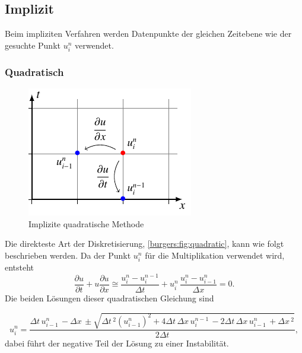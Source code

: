 \subsection{Implizit}
%
	Beim impliziten Verfahren werden Datenpunkte der gleichen Zeitebene wie der gesuchte Punkt $u_{i}^{n}$ verwendet.


\subsubsection{Quadratisch}
     \begin{figure}
	\centering
	\includegraphics[height=.4\textwidth]{papers/burgers/BurgersEquation/tikz/quadratic/quadratic.pdf}
	\caption{Implizite quadratische Methode}
	\label{burgers:fig:quadratic}
	\end{figure}

	Die direkteste Art der Diskretisierung, \autoref{burgers:fig:quadratic}, kann wie folgt beschrieben werden.
	Da der Punkt $u_{i}^{n}$ f\"ur die Multiplikation verwendet wird, entsteht
	\begin{equation}
	\frac {\partial u}{\partial t}+u{\frac {\partial u}{\partial x}} \cong \frac{u_{i}^{n}-u_{i}^{n-1}}{\Delta t}+ u_{i}^{n}\, \frac{u_{i}^{n}-u_{i-1}^{n}}{\Delta x}=0.
	\end{equation}
	Die beiden L\"osungen dieser quadratischen Gleichung sind

	\begin{equation}
	  u_{i}^{n} =
	     \dfrac{\Delta{t}\, u^{n}_{i-1}\, - \Delta{x}\, \pm \sqrt{\Delta{t}\,^{2} (u^{n}_{i-1})^{2} + 4 \Delta{t}\, \Delta{x}\, u^{n-1}_{i}\, - 2 \Delta{t}\, \Delta{x}\, u^{n}_{i-1}\, + \Delta{x}\,^{2}}}{2 \Delta{t}},
	\end{equation}
	dabei f\"uhrt der negative Teil der L\"osung zu einer Instabilität.


